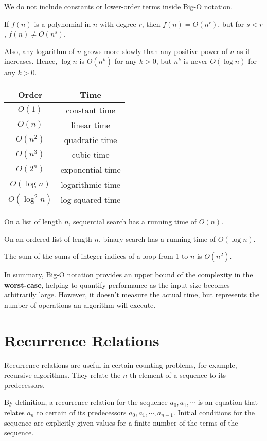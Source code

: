 We do not include constants or lower-order terms inside Big-O notation.

If \(f(n)\) is a polynomial in \(n\) with degree \(r\), then \(f(n) = O(n^r)\), but for \(s < r\), \(f(n) \neq O(n^s)\).

Also, any logarithm of \(n\) grows more slowly than any positive power of \(n\) as it increases. Hence, \(\log n\) is \(O(n^k)\) for any \(k > 0\), but \(n^k\) is never \(O(\log n)\) for any \(k > 0\).

\begin{table}[H]
  \centering
  \begin{tabular}{c|c}
      \toprule
      Order & Time  \\
    \midrule
      \(O(1)\) & constant time  \\
      \(O(n)\) & linear time  \\
      \(O(n^2)\) & quadratic time  \\
      \(O(n^3)\) & cubic time  \\
      \(O(2^n)\) & exponential time  \\
      \(O(\log n)\) & logarithmic time  \\
      \(O(\log^2 n)\) & log-squared time  \\
      \bottomrule
  \end{tabular}
\end{table}

On a list of length \(n\), sequential search has a running time of \(O(n)\).

On an ordered list of length \(n\), binary search has a running time of \(O(\log n)\).

The sum of the sums of integer indices of a loop from 1 to \(n\) is \(O(n^2)\).

In summary, Big-O notation provides an upper bound of the complexity in the \textbf{worst-case}, helping to quantify performance as the input size becomes arbitrarily large. However, it doesn't measure the actual time, but represents the number of operations an algorithm will execute.

\section{Recurrence Relations}
Recurrence relations are useful in certain counting problems, for example, recursive algorithms. They relate the \(n\)-th element of a sequence to its predecessors.

By definition, a recurrence relation for the sequence \(a_0, a_1, \cdots\) is an equation that relates \(a_n\) to certain of its predecessors \(a_0, a_1, \cdots, a_{n-1}\). Initial conditions for the sequence are explicitly given values for a finite number of the terms of the sequence.

